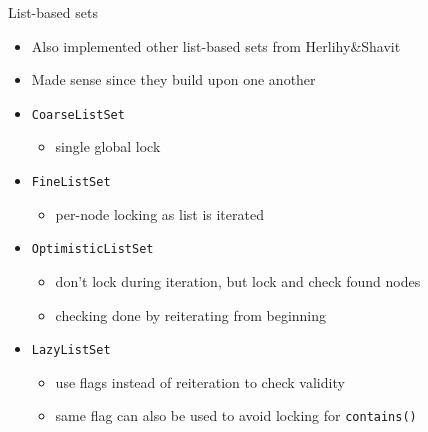 \documentclass[aspectratio=43]{beamer}
\begin{document}
\begin{frame}{List-based sets}
  \begin{itemize}
  \item{Also implemented other list-based sets from Herlihy\&Shavit}
  \item{Made sense since they build upon one another}
  \end{itemize}

  \begin{itemize}
  \item{\texttt{CoarseListSet}}
    \begin{itemize}
    \item{single global lock}
    \end{itemize}
  \item{\texttt{FineListSet}}
    \begin{itemize}
    \item{per-node locking as list is iterated}
    \end{itemize}
  \item{\texttt{OptimisticListSet}}
    \begin{itemize}
    \item{don't lock during iteration, but lock and check found nodes}
    \item{checking done by reiterating from beginning}
    \end{itemize}
  \item{\texttt{LazyListSet}}
    \begin{itemize}
    \item{use flags instead of reiteration to check validity}
    \item{same flag can also be used to avoid locking for \texttt{contains()}}
    \end{itemize}
  \end{itemize}

\end{frame}
\end{document}
